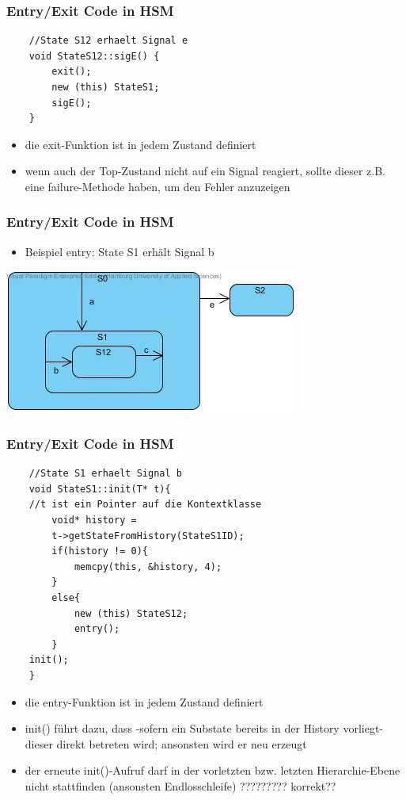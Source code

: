 \documentclass{beamer}
\begin{document}
\begin{frame}[fragile]
	\frametitle{Entry/Exit Code in HSM }
	\begin{lstlisting}
	//State S12 erhaelt Signal e
    void StateS12::sigE() {
        exit(); 
        new (this) StateS1;
        sigE();
	}
	\end{lstlisting}
	\begin{itemize}
		\item die exit-Funktion ist in jedem Zustand definiert
		\item wenn auch der Top-Zustand nicht auf ein Signal reagiert, sollte dieser z.B. eine
		failure-Methode haben, um den Fehler anzuzeigen
	\end{itemize}
\end{frame}

\begin{frame}
	\frametitle{Entry/Exit Code in HSM  }
	\begin{itemize}
		\item Beispiel entry: State S1 erh\"alt Signal b
	\end{itemize}
	\includegraphics[scale=.6]{img/beispiel_entrySM}
\end{frame}

\begin{frame}[fragile]
	\frametitle{Entry/Exit Code in HSM }
	\begin{lstlisting}
	//State S1 erhaelt Signal b
    void StateS1::init(T* t){
    //t ist ein Pointer auf die Kontextklasse
        void* history = 
        t->getStateFromHistory(StateS1ID);
        if(history != 0){
	        memcpy(this, &history, 4);
        }
        else{
            new (this) StateS12;
            entry();
        }
    init(); 
    }
	\end{lstlisting}
\end{frame}

\begin{frame}[fragile]
	\begin{itemize}
		\item die entry-Funktion ist in jedem Zustand definiert
		\item init() f\"uhrt dazu, dass -sofern ein Substate bereits in der History vorliegt- dieser direkt betreten wird; ansonsten wird er neu erzeugt
		\item der erneute init()-Aufruf darf in der vorletzten bzw. letzten Hierarchie-Ebene nicht stattfinden (ansonsten Endlosschleife) ????????? korrekt??

	\end{itemize}
\end{frame}
\end{document}
